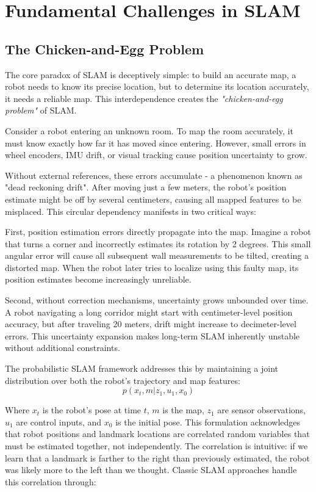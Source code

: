 \documentclass[12pt]{article}
\begin{document}
    \section{Fundamental Challenges in SLAM}

    \subsection{The Chicken-and-Egg Problem}
    
    The core paradox of SLAM is deceptively simple: to build an accurate map, a robot needs to know its precise location, but to determine its location accurately, it needs a reliable map. 
    This interdependence creates the \textit{"chicken-and-egg problem"} of SLAM.
    
    Consider a robot entering an unknown room. To map the room accurately, it must know exactly how far it has moved since entering. However, small errors in wheel encoders, IMU drift, or visual
    tracking cause position uncertainty to grow. 
    
    Without external references, these errors accumulate - a phenomenon known as "dead reckoning drift". After moving just a few meters, the robot's position estimate might be off by several centimeters, 
    causing all mapped features to be misplaced.
    This circular dependency manifests in two critical ways:
    
    First, position estimation errors directly propagate into the map. Imagine a robot that turns a corner and incorrectly estimates its rotation by 2 degrees. This small angular error will cause all subsequent 
    wall measurements to be tilted, creating a distorted map. When the robot later tries to localize using this faulty map, its position estimates become increasingly unreliable.

    Second, without correction mechanisms, uncertainty grows unbounded over time. A robot navigating a long corridor might start with centimeter-level position accuracy, but after traveling 20 meters, drift might increase 
    to decimeter-level errors. This uncertainty expansion makes long-term SLAM inherently unstable without additional constraints.
    
    The probabilistic SLAM framework addresses this by maintaining a joint distribution over both the robot's trajectory and map features:
    \[p(x_t, m | z_{1}, u_{1}, x_0)\]

    Where $x_t$ is the robot's pose at time $t$, $m$ is the map, $z_{1}$ are sensor observations, $u_{1}$ are control inputs, and $x_0$ is the initial pose.
    This formulation acknowledges that robot positions and landmark locations are correlated random variables that must be estimated together, not independently. The correlation is intuitive: 
    if we learn that a landmark is farther to the right than previously estimated, the robot was likely more to the left than we thought.
    Classic SLAM approaches handle this correlation through:
\end{document}
